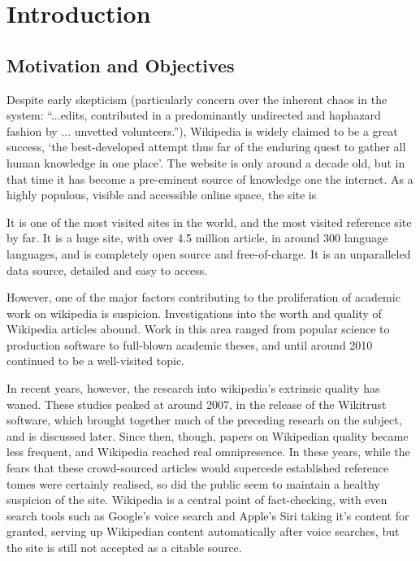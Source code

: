 \chapter{Introduction}

\section{Motivation and Objectives}

Despite early skepticism (particularly concern over the inherent chaos
in the system: ``...edits, contributed in a predominantly undirected
and haphazard fashion by ... unvetted
volunteers.''\cite{Wilkinson2007}), Wikipedia is widely claimed to be
a great success, `the best-developed attempt thus far of the enduring
quest to gather all human knowledge in one
place'\cite{Mesgari2014}. The website is only around a decade old, but
in that time it has become a pre-eminent source of knowledge one the
internet. As a highly populous, visible and accessible online space,
the site is 

It is one of the most visited sites in the world, and the
most visited reference site by far. It is a huge site, with over 4.5
million article, in around 300 language languages, and is completely
open source and free-of-charge. It is an unparalleled data source,
detailed and easy to access.

However, one of the major factors contributing to the proliferation of
academic work on wikipedia is suspicion. Investigations into the worth
and quality of Wikipedia articles abound. Work in this area ranged
from popular science to production software to full-blown academic
theses, and until around 2010 continued to be a well-visited topic.

In recent years, however, the research into wikipedia's extrinsic
quality has waned. These studies peaked at around 2007, in the release
of the Wikitrust software, which brought together much of the
preceding researh on the subject, and is discussed later. Since then,
though, papers on Wikipedian quality became less frequent, and
Wikipedia reached real omnipresence.  In these years, while the fears
that these crowd-sourced articles would supercede established
reference tomes were certainly realised, so did the public seem to
maintain a healthy suspicion of the site. Wikipedia is a central point
of fact-checking, with even search tools such as Google's voice search
and Apple's Siri taking it's content for granted, serving up
Wikipedian content automatically after voice searches, but the site is
still not accepted as a citable source.

